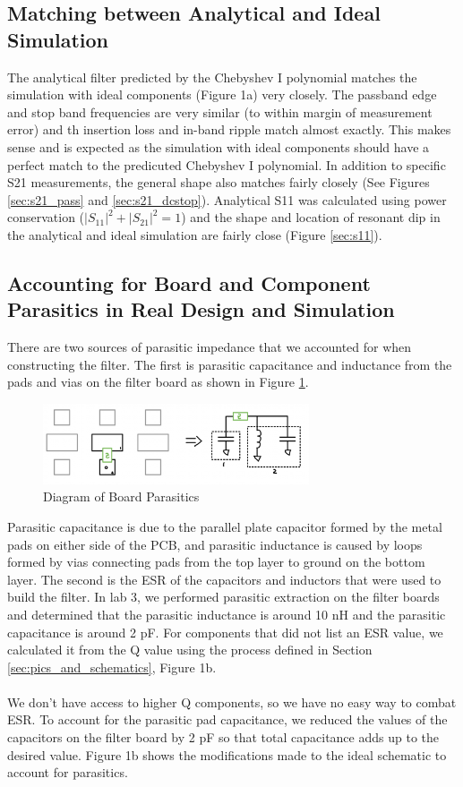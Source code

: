 \documentclass[letterpaper,12pt]{article}
\begin{document}
\subsection{Matching between Analytical and Ideal Simulation}
The analytical filter predicted by the Chebyshev I polynomial matches the simulation with ideal components (Figure 1a) very closely. The passband edge and stop band frequencies are very similar (to within margin of measurement error) and th insertion loss and in-band ripple match almost exactly. This makes sense and is expected as the simulation with ideal components should have a perfect match to the predicuted Chebyshev I polynomial. In addition to specific S21 measurements, the general shape also matches fairly closely (See Figures \ref{sec:s21_pass} and \ref{sec:s21_dcstop}). Analytical S11 was calculated using power conservation ($|S_{11}|^2 + |S_{21}|^2 = 1$) and the shape and location of resonant dip in the analytical and ideal simulation are fairly close (Figure \ref{sec:s11}).
\subsection{Accounting for Board and Component Parasitics in Real Design and Simulation}
There are two sources of parasitic impedance that we accounted for when constructing the filter. The first is parasitic capacitance and inductance from the pads and vias on the filter board as shown in Figure \ref{fig:9.board_parasitics}.

\begin{figure}[H]
  \centering \includegraphics[width=0.7\textwidth]{figures/9.parasitics}
  \caption{Diagram of Board Parasitics \label{fig:9.board_parasitics}}
\end{figure}
\noindent
Parasitic capacitance is due to the parallel plate capacitor formed by the metal pads on either side of the PCB, and parasitic inductance is caused by loops formed by vias connecting pads from the top layer to ground on the bottom layer. The second is the ESR of the capacitors and inductors that were used to build the filter. In lab 3, we performed parasitic extraction on the filter boards and determined that the parasitic inductance is around 10 nH and the parasitic capacitance is around 2 pF. For components that did not list an ESR value, we calculated it from the Q value using the process defined in Section \ref{sec:pics_and_schematics}, Figure 1b.
\\
\\
We don't have access to higher Q components, so we have no easy way to combat ESR. To account for the parasitic pad capacitance, we reduced the values of the capacitors on the filter board by 2 pF so that total capacitance adds up to the desired value. Figure 1b shows the modifications made to the ideal schematic to account for parasitics.
\end{document}
